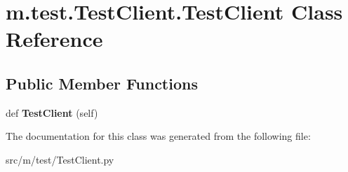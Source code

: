 \hypertarget{classm_1_1test_1_1_test_client_1_1_test_client}{}\section{m.\+test.\+Test\+Client.\+Test\+Client Class Reference}
\label{classm_1_1test_1_1_test_client_1_1_test_client}
\subsection*{Public Member Functions}
\begin{DoxyCompactItemize}
\item 
\hypertarget{classm_1_1test_1_1_test_client_1_1_test_client_ae3a37f5a0809f3a8e081fcd1c0d1ae81}{}def {\bfseries Test\+Client} (self)\label{classm_1_1test_1_1_test_client_1_1_test_client_ae3a37f5a0809f3a8e081fcd1c0d1ae81}

\end{DoxyCompactItemize}


The documentation for this class was generated from the following file\+:\begin{DoxyCompactItemize}
\item 
src/m/test/Test\+Client.\+py\end{DoxyCompactItemize}
